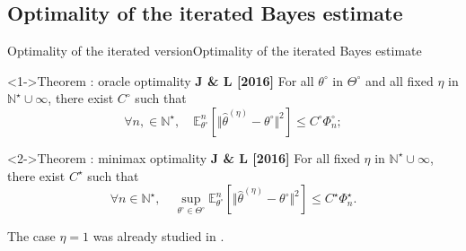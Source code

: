 \documentclass[10pt]{beamer}
\begin{document}


\subsection{Optimality of the iterated Bayes estimate}
\begin{frame}{Optimality of the iterated version}{Optimality of the iterated Bayes estimate}
\begin{block}<1->{Theorem : oracle optimality \textbf{J \& L [2016]}}
For all $\theta^{\circ}$ in $\Theta^{\circ}$ and all fixed $\eta$ in $\mathbb{N}^{\star} \cup \infty$, there exist $C^{\circ}$ such that
	\[\forall n, \in \mathbb{N}^{\star}, \quad \mathbb{E}_{\theta^{\circ}}^{n}\left[\Vert \widehat{\theta}^{\left(\eta\right)} - \theta^{\circ} \Vert^{2}\right] \leq C^{\circ} \Phi_{n}^{\circ};\]
\end{block}
\begin{block}<2->{Theorem : minimax optimality \textbf{J \& L [2016]}}
For all fixed $\eta$ in $\mathbb{N}^{\star} \cup \infty$, there exist $C^{\star}$ such that
	\[\forall n \in \mathbb{N}^{\star}, \quad \sup\limits_{\theta^{\circ}\in \Theta^{\circ}}\mathbb{E}_{\theta^{\circ}}^{n}\left[\Vert \widehat{\theta}^{\left(\eta\right)} - \theta^{\circ} \Vert^{2}\right] \leq C^{\star} \Phi_{n}^{\star}.\]
\end{block}
The case $\eta = 1$ was already studied in \textbf{\citet{JJASRS}}.
\end{frame}
\end{document}
